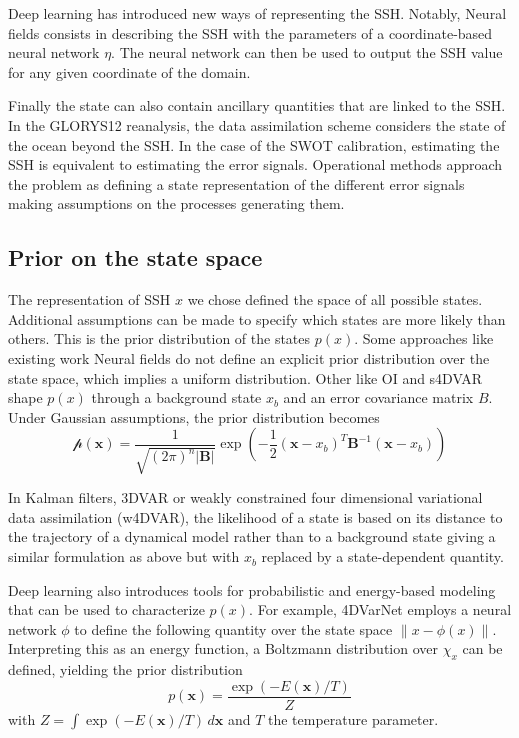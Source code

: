 \begin{bibunit}
Deep learning has introduced new ways of representing the SSH. Notably, Neural fields\cite{johnsonNeuralFieldsFast2022} consists in describing the SSH with the parameters of a coordinate-based neural network $\eta$. The neural network can then be used to output the SSH value for any given coordinate of the domain.


Finally the state can also contain ancillary quantities that are linked to the SSH. In the GLORYS12\cite{lelloucheCopernicusGlobal122021} reanalysis, the data assimilation scheme considers the state of the ocean beyond the SSH. 
In the case of the SWOT calibration, estimating the SSH is equivalent to estimating the error signals. Operational methods\cite{dibarboureDataDrivenCalibrationAlgorithm2022} approach the problem as defining a state representation of the different error signals making assumptions on the processes generating them.

\subsection{Prior on the state space}
The representation of SSH $x$ we chose defined the space of all possible states. Additional assumptions can be made to specify which states are more likely than others. This is the prior distribution of the states $p(x)$.
Some approaches like existing work Neural fields do not define an explicit prior distribution over the state space, which implies a uniform distribution.
Other like OI and s4DVAR shape $p(x)$ through a background state $x_b$ and an error covariance matrix $B$. Under Gaussian assumptions, the prior distribution becomes 
 $$\mathcal{p}(\mathbf{x}) = \frac{1}{\sqrt{(2\pi)^n |\mathbf{B}|}} \exp\left(-\frac{1}{2} (\mathbf{x} - x_b)^T \mathbf{B}^{-1} (\mathbf{x} - x_b)\right)$$

In Kalman filters, 3DVAR or weakly constrained four dimensional variational data assimilation (w4DVAR), the likelihood of a state is based on its distance to the trajectory of a dynamical model rather than to a background state giving a similar formulation as above but with $x_b$ replaced by a state-dependent quantity.

Deep learning also introduces tools for probabilistic and energy-based modeling that can be used to characterize $p(x)$.
 For example, 4DVarNet employs a neural network $\phi$ to define the following quantity over the state space $\| x - \phi(x)\|$. Interpreting this as an energy function, a Boltzmann distribution over $\chi_x$ can be defined, yielding the prior distribution
 $$p(\mathbf{x}) = \frac{\exp(-E(\mathbf{x}) / T)}{Z}$$
 with $Z = \int \exp(-E(\mathbf{x}) / T) \, d\mathbf{x}$ and $T$ the temperature parameter.




\end{bibunit}
